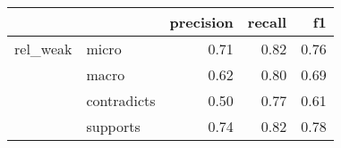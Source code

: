\begin{tabular}{llrrr}
\toprule
         &          &  precision &  recall &   f1 \\
\midrule
rel\_weak & micro &       0.71 &    0.82 & 0.76 \\
         & macro &       0.62 &    0.80 & 0.69 \\
         & contradicts &       0.50 &    0.77 & 0.61 \\
         & supports &       0.74 &    0.82 & 0.78 \\
\bottomrule
\end{tabular}
